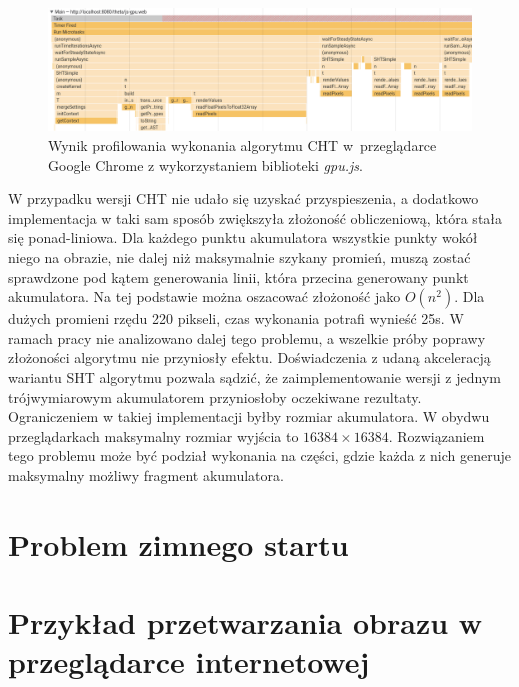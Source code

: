 

\begin{figure}[h]
    \centering
    \includegraphics[width=\linewidth]{img/gpu-profiler.png}
    \caption{Wynik profilowania wykonania algorytmu CHT w~przeglądarce Google Chrome z wykorzystaniem biblioteki \textit{gpu.js}.}
    \label{fig:profiler-gpu}
\end{figure}


W przypadku wersji CHT nie udało się uzyskać przyspieszenia, a dodatkowo implementacja w taki sam sposób zwiększyła złożoność obliczeniową, która stała się ponad-liniowa. Dla każdego punktu akumulatora wszystkie punkty wokół niego na obrazie, nie dalej niż maksymalnie szykany promień, muszą zostać sprawdzone pod kątem generowania linii, która przecina generowany punkt akumulatora. Na tej podstawie można oszacować złożoność jako $O(n^2)$. Dla dużych promieni rzędu 220 pikseli, czas wykonania potrafi wynieść 25s. W ramach pracy nie analizowano dalej tego problemu, a wszelkie próby poprawy złożoności algorytmu nie przyniosły efektu. Doświadczenia z udaną akceleracją wariantu SHT algorytmu pozwala sądzić, że zaimplementowanie wersji z jednym trójwymiarowym akumulatorem przyniosłoby oczekiwane rezultaty. Ograniczeniem w takiej implementacji byłby rozmiar akumulatora. W obydwu przeglądarkach maksymalny rozmiar wyjścia to $16384\times16384$. Rozwiązaniem tego problemu może być podział wykonania na części, gdzie każda z nich generuje maksymalny możliwy fragment akumulatora.

\section{Problem zimnego startu}


\section{Przykład przetwarzania obrazu w przeglądarce internetowej}
